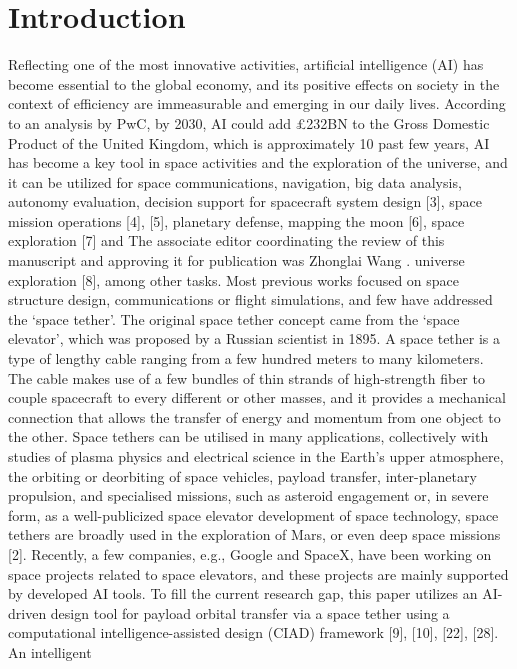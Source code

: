 \documentclass[conference]{IEEEtran}
\begin{document}
\section{Introduction}
Reflecting one of the most innovative activities, artificial
intelligence (AI) has become essential to the global economy,
and its positive effects on society in the context of efficiency
are immeasurable and emerging in our daily lives. According
to an analysis by PwC, by 2030, AI could add £232BN to
the Gross Domestic Product of the United Kingdom, which
is approximately 10%
past few years, AI has become a key tool in space activities
and the exploration of the universe, and it can be utilized
for space communications, navigation, big data analysis,
autonomy evaluation, decision support for spacecraft system design [3], space mission operations [4], [5], planetary
defense, mapping the moon [6], space exploration [7] and
The associate editor coordinating the review of this manuscript and
approving it for publication was Zhonglai Wang .
universe exploration [8], among other tasks. Most previous
works focused on space structure design, communications or
flight simulations, and few have addressed the ‘space tether’.
The original space tether concept came from the ‘space
elevator’, which was proposed by a Russian scientist in 1895.
A space tether is a type of lengthy cable ranging from a
few hundred meters to many kilometers. The cable makes
use of a few bundles of thin strands of high-strength fiber
to couple spacecraft to every different or other masses, and
it provides a mechanical connection that allows the transfer
of energy and momentum from one object to the other. Space
tethers can be utilised in many applications, collectively with
studies of plasma physics and electrical science in the Earth’s
upper atmosphere, the orbiting or deorbiting of space vehicles, payload transfer, inter-planetary propulsion, and specialised missions, such as asteroid engagement or, in severe
form, as a well-publicized space elevator development of space technology, space tethers are broadly
used in the exploration of Mars, or even deep space missions [2]. Recently, a few companies, e.g., Google and
SpaceX, have been working on space projects related to
space elevators, and these projects are mainly supported by
developed AI tools.
To fill the current research gap, this paper utilizes an
AI-driven design tool for payload orbital transfer via a
space tether using a computational intelligence-assisted
design (CIAD) framework [9], [10], [22], [28]. An intelligent
\end{document}

